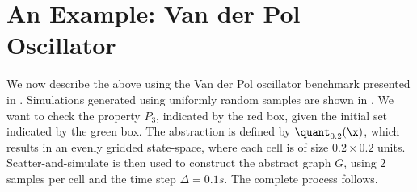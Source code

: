 \section{An Example: Van der Pol Oscillator}

We now describe the above using the Van der Pol oscillator benchmark
presented in . Simulations generated using
uniformly random samples are shown in . We want to
check the property $P_3$, indicated by the red box, given the initial
set indicated by the green box. The abstraction is defined by
$\quant_{0.2}(\x)$, which results in an evenly gridded state-space,
where each cell is of size $0.2 \times 0.2$ units.
Scatter-and-simulate is then used to construct the abstract graph $G$,
using $2$ samples per cell and the time step $\Delta = 0.1s$. The
complete process follows.

